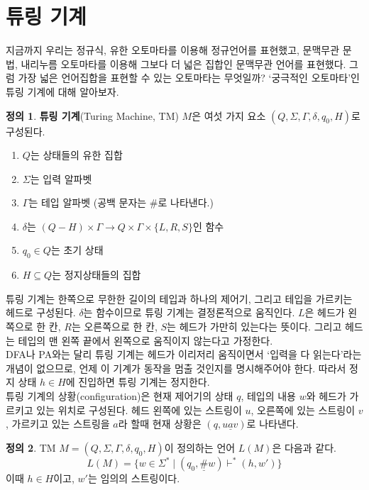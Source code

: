 \documentclass[b5paper]{book}
\theoremstyle{definition}
\newtheorem{defn}{정의}[chapter]
\begin{document}
\section{튜링 기계} \label{turing machine}
지금까지 우리는 정규식, 유한 오토마타를 이용해 정규언어를 표현했고, 문맥무관 문법, 내리누름 오토마타를
이용해 그보다 더 넓은 집합인 문맥무관 언어를 표현했다. 
그럼 가장 넓은 언어집합을 표현할 수 있는 오토마타는 무엇일까?
`궁극적인 오토마타'인 튜링 기계에 대해 알아보자. 
\begin{defn}
    \textbf{튜링 기계}(Turing Machine, TM) $M$은 여섯 가지 요소 $(Q, \Sigma, \Gamma, 
    \delta, q_0, H)$로
    구성된다. 
    \begin{enumerate}
        \item $Q$는 상태들의 유한 집합
        \item $\Sigma$는 입력 알파벳
        \item $\Gamma$는 테입 알파벳 (공백 문자는 \#로 나타낸다.)
        \item $\delta$는 $(Q - H) \times \Gamma \rightarrow Q \times 
        \Gamma \times \{L, R, S\}$인 함수
        \item $q_0 \in Q$는 초기 상태
        \item $H \subseteq Q$는 정지상태들의 집합
    \end{enumerate}
\end{defn}
튜링 기계는 한쪽으로 무한한 길이의 테입과 하나의 제어기, 그리고 테입을 가르키는 헤드로 구성된다.
$\delta$는 함수이므로 튜링 기계는 결정론적으로 움직인다. $L$은 헤드가 왼쪽으로 한 칸, $R$는
오른쪽으로 한 칸, $S$는 헤드가 가만히 있는다는 뜻이다. 그리고
헤드는 테입의 맨 왼쪽 끝에서 왼쪽으로 움직이지 않는다고 가정한다.\\ 
DFA나 PA와는 달리 튜링 기계는 헤드가 이리저리 움직이면서 `입력을 다 읽는다'라는 개념이 없으므로, 언제 
이 기계가 동작을 멈출 것인지를 명시해주어야 한다. 따라서 정지 상태 $h \in H$에 진입하면 튜링 기계는 정지한다.  \\ 
튜링 기계의 상황(configuration)은 현재 제어기의 상태 $q$, 테입의 내용 $w$와 헤드가 가르키고 있는 위치로 구성된다.
헤드 왼쪽에 있는 스트링이 $u$, 오른쪽에 있는 스트링이 $v$, 가르키고 있는 스트링을 $a$라 할때 현재 상황은
$(q, u\underline{a}v)$로 나타낸다.  
\begin{defn}
    TM $M = (Q, \Sigma, \Gamma, \delta, q_0, H)$이 정의하는 언어 $L(M)$은 다음과 같다.
    $$ L(M) = \{ w \in \Sigma^*  \;\vert\;  (q_0, \underline{\#}w) \vdash^* (h, w') \} $$
    이때 $h\in H$이고, $w'$는 임의의 스트링이다.  
\end{defn}
\end{document}
